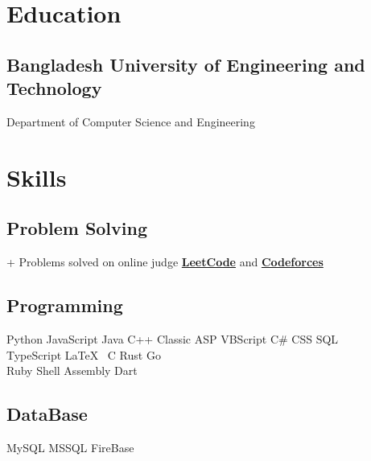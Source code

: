 \documentclass[]{plushcv}
\begin{document}
\begin{minipage}[t]{0.34\textwidth} 

\section{Education} 
\subsection{Bangladesh University of Engineering and Technology}
Department of Computer Science and Engineering \\
\sectionsep



\section{Skills}
\subsection{Problem Solving}
+ Problems solved on online judge 
\href{https://leetcode.com/An1ndya/}{\textbf{LeetCode}}
and 
\href{https://codeforces.com/profile/an1ndya}{\textbf{Codeforces}} 
\sectionsep
\sectionsep
\subsection{Programming}
\sectionsep
{}
Python\textbullet{} JavaScript \textbullet{} Java \textbullet{}   C++ \textbullet{}
 Classic ASP  \textbullet{} VBScript \textbullet{}  C\#   \textbullet{} CSS \textbullet{} 
 SQL \\
\sectionsep
{}
TypeScript \textbullet{} \LaTeX\ \textbullet{} C \textbullet{} 
Rust  \textbullet{} Go \\
\sectionsep
{}
Ruby \textbullet{}  Shell \textbullet{} Assembly \textbullet{}  Dart  \\
\sectionsep
\subsection{DataBase}
\sectionsep
MySQL \textbullet{} MSSQL \textbullet{} FireBase  \\
\sectionsep

\end{minipage}
\end{document}
